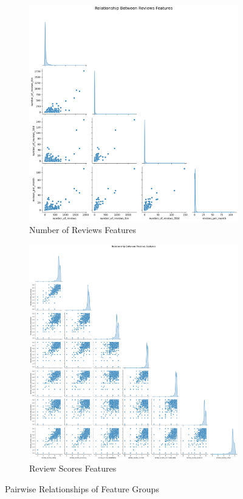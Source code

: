 \documentclass[12pt]{article}
\begin{document}
\begin{figure}[H]
\begin{subfigure}[b]{0.4\textwidth}
    \includegraphics[width=\textwidth]{images/nor_short.png}
    \caption{Number of Reviews Features}
    \label{fig:nor_short}
\end{subfigure}
\hfill
\begin{subfigure}[b]{0.4\textwidth}
    \includegraphics[width=\textwidth]{images/rs_short.png}
    \caption{Review Scores Features}
    \label{fig:rs_short}
\end{subfigure}
\caption{Pairwise Relationships of Feature Groups}
\label{fig:pairwise_plots}
\end{figure}
\end{document}
